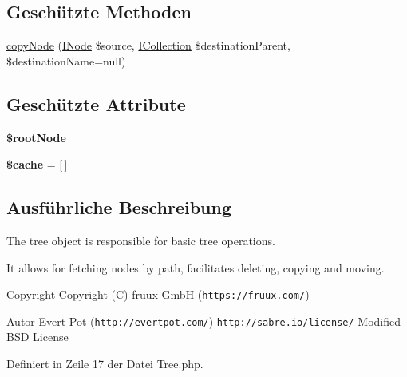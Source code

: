 \subsection*{Geschützte Methoden}
\begin{DoxyCompactItemize}
\item 
\mbox{\hyperlink{class_sabre_1_1_d_a_v_1_1_tree_a85d28f1522d5c90d5a4b6db3ddb084b2}{copy\+Node}} (\mbox{\hyperlink{interface_sabre_1_1_d_a_v_1_1_i_node}{I\+Node}} \$source, \mbox{\hyperlink{interface_sabre_1_1_d_a_v_1_1_i_collection}{I\+Collection}} \$destination\+Parent, \$destination\+Name=null)
\end{DoxyCompactItemize}
\subsection*{Geschützte Attribute}
\begin{DoxyCompactItemize}
\item 
\mbox{\label{class_sabre_1_1_d_a_v_1_1_tree_a46cd189942756cb7927230a7fd112b50}} 
{\bfseries \$root\+Node}
\item 
\mbox{\label{class_sabre_1_1_d_a_v_1_1_tree_af7a13a04301867eee0f1892440047f1f}} 
{\bfseries \$cache} = \mbox{[}$\,$\mbox{]}
\end{DoxyCompactItemize}


\subsection{Ausführliche Beschreibung}
The tree object is responsible for basic tree operations.

It allows for fetching nodes by path, facilitates deleting, copying and moving.

\begin{DoxyCopyright}{Copyright}
Copyright (C) fruux GmbH (\href{https://fruux.com/}{\tt https\+://fruux.\+com/}) 
\end{DoxyCopyright}
\begin{DoxyAuthor}{Autor}
Evert Pot (\href{http://evertpot.com/}{\tt http\+://evertpot.\+com/})  \href{http://sabre.io/license/}{\tt http\+://sabre.\+io/license/} Modified B\+SD License 
\end{DoxyAuthor}


Definiert in Zeile 17 der Datei Tree.\+php.



